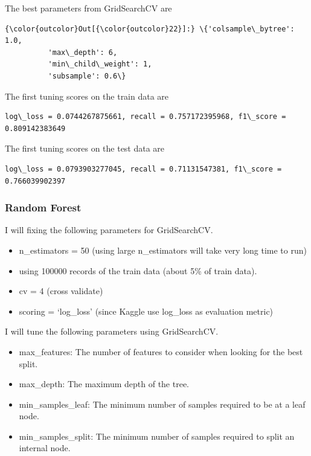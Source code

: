 \documentclass[11pt]{article}
\begin{document}
    The best parameters from GridSearchCV are

            \begin{Verbatim}[commandchars=\\\{\}]
{\color{outcolor}Out[{\color{outcolor}22}]:} \{'colsample\_bytree': 1.0,
          'max\_depth': 6,
          'min\_child\_weight': 1,
          'subsample': 0.6\}
\end{Verbatim}
        
    The first tuning scores on the train data are

    \begin{Verbatim}[commandchars=\\\{\}]
log\_loss = 0.0744267875661, recall = 0.757172395968, f1\_score = 0.809142383649

    \end{Verbatim}

    The first tuning scores on the test data are

    \begin{Verbatim}[commandchars=\\\{\}]
log\_loss = 0.0793903277045, recall = 0.71131547381, f1\_score = 0.766039902397

    \end{Verbatim}

    \subsubsection{Random Forest}\label{random-forest}

I will fixing the following parameters for GridSearchCV.

\begin{itemize}
\itemsep1pt\parskip0pt
\item
  n\_estimators = 50 (using large n\_estimators will take very long time
  to run)
\item
  using 100000 records of the train data (about 5\% of train data).
\item
  cv = 4 (cross validate)
\item
  scoring = `log\_loss' (since Kaggle use log\_loss as evaluation
  metric)
\end{itemize}

I will tune the following parameters using GridSearchCV.

\begin{itemize}
\itemsep1pt\parskip0pt
\item
  max\_features: The number of features to consider when looking for the
  best split.
\item
  max\_depth: The maximum depth of the tree.
\item
  min\_samples\_leaf: The minimum number of samples required to be at a
  leaf node.
\item
  min\_samples\_split: The minimum number of samples required to split
  an internal node.
\end{itemize}
\end{document}
